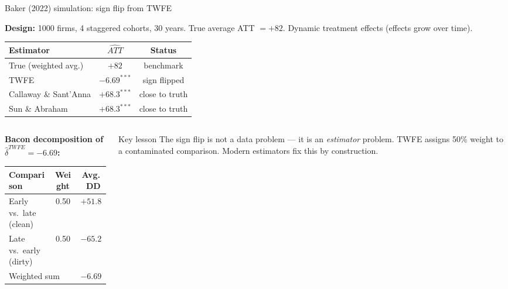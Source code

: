 \documentclass[aspectratio=169, 10pt]{beamer}
\begin{document}
\begin{frame}{Baker (2022) simulation: sign flip from TWFE}

  \textbf{Design:} 1000 firms, 4 staggered cohorts, 30 years. True average ATT $= +82$. Dynamic treatment effects (effects grow over time).

  \medskip
  \begin{center}
  \small
  \begin{tabular}{lcc}
    \toprule
    Estimator & $\hat{ATT}$ & Status \\
    \midrule
    True (weighted avg.) & $+82$ & benchmark \\
    TWFE & $-6.69^{***}$ & \textcolor{ecred}{sign flipped} \\
    Callaway \& Sant'Anna & $+68.3^{***}$ & close to truth \\
    Sun \& Abraham & $+68.3^{***}$ & close to truth \\
    \bottomrule
  \end{tabular}
  \end{center}

  \medskip
  \begin{columns}[T]
    \begin{column}{0.48\textwidth}
      \textbf{Bacon decomposition of $\hat\delta^{TWFE} = -6.69$:}\\[4pt]
      \small
      \begin{tabular}{lcc}
        \toprule
        Comparison & Weight & Avg.\ DD \\
        \midrule
        Early vs.\ late (clean) & 0.50 & $+51.8$ \\
        Late vs.\ early (dirty) & 0.50 & $-65.2$ \\
        \midrule
        \multicolumn{2}{l}{Weighted sum} & $-6.69$ \\
        \bottomrule
      \end{tabular}
    \end{column}
    \begin{column}{0.45\textwidth}
      \begin{alertblock}{Key lesson}
        The sign flip is not a data problem — it is an \emph{estimator} problem.
        TWFE assigns 50\% weight to a contaminated comparison.
        Modern estimators fix this by construction.
      \end{alertblock}
    \end{column}
  \end{columns}

\end{frame}
\end{document}
